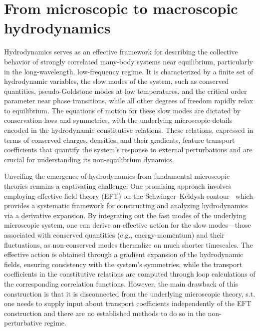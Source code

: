 \documentclass[letterpaper,11pt]{article}
\begin{document}
\section{From microscopic to macroscopic hydrodynamics}
Hydrodynamics serves as an effective framework for describing the collective behavior of strongly correlated many-body systems near equilibrium, particularly in the long-wavelength, low-frequency regime.  It is characterized by a finite set of hydrodynamic variables, the slow modes of the system, such as conserved quantities, pseudo-Goldstone modes at low temperatures, and the critical order parameter near phase transitions, while all other degrees of freedom rapidly relax to equilibrium. The equations of motion for these slow modes are dictated by conservation laws and symmetries, with the underlying microscopic details encoded in the hydrodynamic constitutive relations. These relations, expressed in terms of conserved charges, densities, and their gradients, feature transport coefficients that quantify the system's response to external perturbations and are crucial for understanding its non-equilibrium dynamics.


Unveiling the emergence of hydrodynamics from fundamental microscopic theories remains a captivating challenge. One promising approach involves employing effective field theory (EFT) on the Schwinger–Keldysh contour~\cite{Crossley:2015evo,Glorioso:2017fpd} which provides a systematic framework for constructing and analyzing hydrodynamics via a derivative expansion. By integrating out the fast modes of the underlying microscopic system, one can derive an effective action for the slow modes—those associated with conserved quantities (e.g., energy-momentum) and their fluctuations, as non-conserved modes thermalize on much shorter timescales. The effective action is obtained through a gradient expansion of the hydrodynamic fields, ensuring consistency with the system's symmetries, while the transport coefficients in the constitutive relations are computed through loop calculations of the corresponding correlation functions. However, the main drawback of this construction is that it is disconnected from the underlying microscopic theory, s.t. one needs to supply input about transport coefficients independently of the EFT construction and there are no established methods to do so in the non-perturbative regime.
\end{document}
